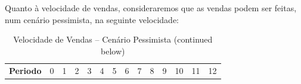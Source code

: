 \documentclass[a4paper]{article}
\begin{document}
Quanto à velocidade de vendas, consideraremos que as vendas podem ser
feitas, num cenário pessimista, na seguinte velocidade:

\begin{longtable}[]{@{}cccccccccccccc@{}}
\caption{Velocidade de Vendas -- Cenário Pessimista (continued
below)}\tabularnewline
\toprule
\begin{minipage}[t]{0.12\columnwidth}\centering\strut
\textbf{Periodo}\strut
\end{minipage} & \begin{minipage}[t]{0.04\columnwidth}\centering\strut
0\strut
\end{minipage} & \begin{minipage}[t]{0.04\columnwidth}\centering\strut
1\strut
\end{minipage} & \begin{minipage}[t]{0.04\columnwidth}\centering\strut
2\strut
\end{minipage} & \begin{minipage}[t]{0.04\columnwidth}\centering\strut
3\strut
\end{minipage} & \begin{minipage}[t]{0.04\columnwidth}\centering\strut
4\strut
\end{minipage} & \begin{minipage}[t]{0.04\columnwidth}\centering\strut
5\strut
\end{minipage} & \begin{minipage}[t]{0.04\columnwidth}\centering\strut
6\strut
\end{minipage} & \begin{minipage}[t]{0.04\columnwidth}\centering\strut
7\strut
\end{minipage} & \begin{minipage}[t]{0.04\columnwidth}\centering\strut
8\strut
\end{minipage} & \begin{minipage}[t]{0.04\columnwidth}\centering\strut
9\strut
\end{minipage} & \begin{minipage}[t]{0.04\columnwidth}\centering\strut
10\strut
\end{minipage} & \begin{minipage}[t]{0.04\columnwidth}\centering\strut
11\strut
\end{minipage} & \begin{minipage}[t]{0.04\columnwidth}\centering\strut
12\strut
\end{minipage}\tabularnewline

\end{longtable}
\end{document}
